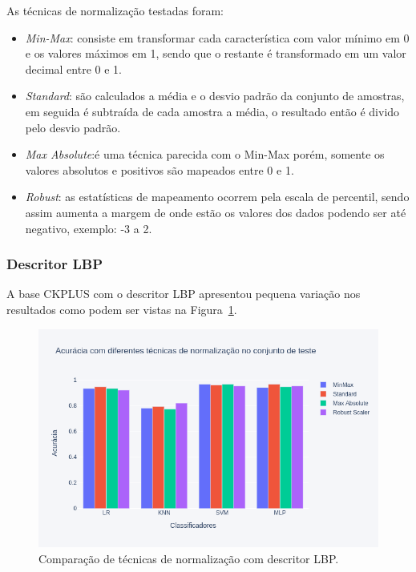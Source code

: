 As técnicas de normalização testadas foram:
\begin{itemize}
	\item \textit{Min-Max}: consiste em transformar cada característica com valor mínimo em 0 e os valores máximos em 1, sendo que o restante é transformado em um valor decimal entre 0 e 1.
	\item \textit{Standard}: são calculados a média e o desvio padrão da conjunto de amostras, em seguida é subtraída de cada amostra a média, o resultado então é divido pelo desvio padrão.
	\item \textit{Max Absolute}:é uma técnica parecida com o Min-Max porém, somente os valores absolutos e positivos são mapeados entre 0 e 1.
	\item \textit{Robust}: as estatísticas de mapeamento ocorrem pela escala de percentil, sendo assim aumenta a margem de onde estão os valores dos dados podendo ser até negativo, exemplo: -3 a 2.
\end{itemize}

\subsubsection{Descritor LBP}
A base CKPLUS com o descritor LBP apresentou pequena variação nos resultados como podem ser vistas na Figura~\ref{fig:bar_norm_all}.

\begin{figure}[!htbp]
	\centering
	\includegraphics[width=1.0\linewidth,clip=true,trim=0cm 0cm 0cm 0cm, keepaspectratio=true]{bar_norm_all.png}
	\caption{Comparação de técnicas de normalização com descritor LBP.}
	\label{fig:bar_norm_all}
\end{figure}


